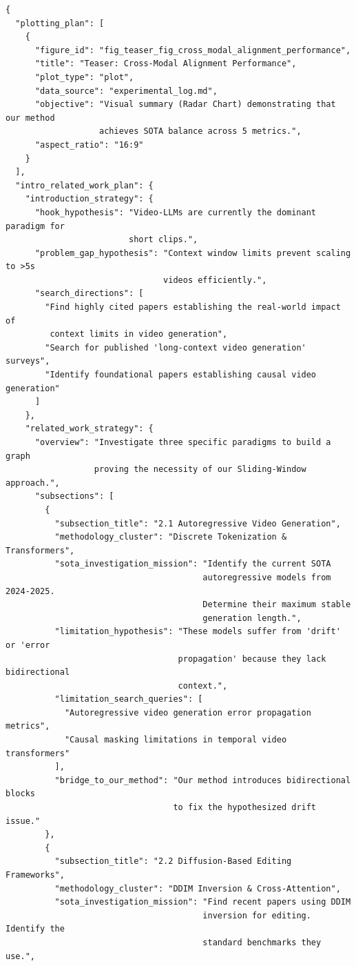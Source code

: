 \begin{verbatim}
{
  "plotting_plan": [
    {
      "figure_id": "fig_teaser_fig_cross_modal_alignment_performance",
      "title": "Teaser: Cross-Modal Alignment Performance",
      "plot_type": "plot",
      "data_source": "experimental_log.md",
      "objective": "Visual summary (Radar Chart) demonstrating that our method 
                   achieves SOTA balance across 5 metrics.",
      "aspect_ratio": "16:9"
    }
  ],
  "intro_related_work_plan": {
    "introduction_strategy": {
      "hook_hypothesis": "Video-LLMs are currently the dominant paradigm for 
                         short clips.",
      "problem_gap_hypothesis": "Context window limits prevent scaling to >5s 
                                videos efficiently.",
      "search_directions": [
        "Find highly cited papers establishing the real-world impact of 
         context limits in video generation",
        "Search for published 'long-context video generation' surveys",
        "Identify foundational papers establishing causal video generation"
      ]
    },
    "related_work_strategy": {
      "overview": "Investigate three specific paradigms to build a graph 
                  proving the necessity of our Sliding-Window approach.",
      "subsections": [
        {
          "subsection_title": "2.1 Autoregressive Video Generation",
          "methodology_cluster": "Discrete Tokenization & Transformers",
          "sota_investigation_mission": "Identify the current SOTA 
                                        autoregressive models from 2024-2025. 
                                        Determine their maximum stable 
                                        generation length.",
          "limitation_hypothesis": "These models suffer from 'drift' or 'error 
                                   propagation' because they lack bidirectional 
                                   context.",
          "limitation_search_queries": [
            "Autoregressive video generation error propagation metrics",
            "Causal masking limitations in temporal video transformers"
          ],
          "bridge_to_our_method": "Our method introduces bidirectional blocks 
                                  to fix the hypothesized drift issue."
        },
        {
          "subsection_title": "2.2 Diffusion-Based Editing Frameworks",
          "methodology_cluster": "DDIM Inversion & Cross-Attention",
          "sota_investigation_mission": "Find recent papers using DDIM 
                                        inversion for editing. Identify the 
                                        standard benchmarks they use.",

\end{verbatim}
